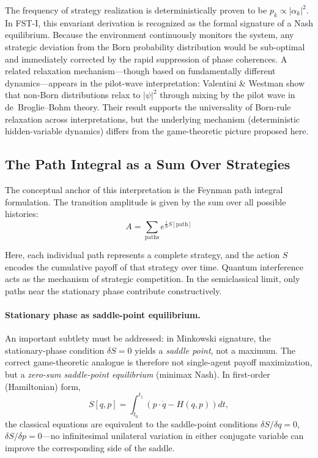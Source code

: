 \documentclass[12pt,a4paper]{article}
\theoremstyle{remark}
\begin{document}
The frequency of strategy realization is deterministically proven to be $p_k \propto |\alpha_k|^2$. In FST-I, this envariant derivation is recognized as the formal signature of a Nash equilibrium. Because the environment continuously monitors the system, any strategic deviation from the Born probability distribution would be sub-optimal and immediately corrected by the rapid suppression of phase coherences. A related relaxation mechanism---though based on fundamentally different dynamics---appears in the pilot-wave interpretation: Valentini \& Westman \citep{ValentiniWestman2005} show that non-Born distributions relax to $|\psi|^2$ through mixing by the pilot wave in de~Broglie--Bohm theory. Their result supports the universality of Born-rule relaxation across interpretations, but the underlying mechanism (deterministic hidden-variable dynamics) differs from the game-theoretic picture proposed here.

\subsection{The Path Integral as a Sum Over Strategies}

The conceptual anchor of this interpretation is the Feynman path integral formulation. The transition amplitude is given by the sum over all possible histories:
\begin{equation}
A = \sum_{\text{paths}} e^{\frac{i}{\hbar} S[\text{path}]}
\end{equation}

Here, each individual path represents a complete strategy, and the action $S$ encodes the cumulative payoff of that strategy over time. Quantum interference acts as the mechanism of strategic competition. In the semiclassical limit, only paths near the stationary phase contribute constructively.

\paragraph{Stationary phase as saddle-point equilibrium.}
An important subtlety must be addressed: in Minkowski signature, the stationary-phase condition $\delta S = 0$ yields a \emph{saddle point}, not a maximum. The correct game-theoretic analogue is therefore not single-agent payoff maximization, but a \emph{zero-sum saddle-point equilibrium} (minimax Nash). In first-order (Hamiltonian) form,
\begin{equation}
S[q,p] = \int_{t_0}^{t_1} \left( p \cdot \dot{q} - H(q,p) \right) dt,
\end{equation}
the classical equations are equivalent to the saddle-point conditions $\delta S / \delta q = 0$, $\delta S / \delta p = 0$---no infinitesimal unilateral variation in either conjugate variable can improve the corresponding side of the saddle.
\end{document}
